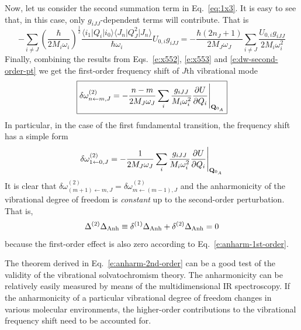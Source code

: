 \documentclass[a4paper,titlepage,twoside,fleqn,12pt]{book}
\begin{document}
\begin{refsection}
Now, let us consider the second summation term in Eq.~\eqref{eq:1x3}.
It is easy to see that, in this case, only $g_{iJJ}$\hyp{}dependent terms will
contribute. That is
%
\begin{equation}  \label{e:x553}
-\sum_{i\ne J} \left( \frac{\hbar}{2M_i\omega_i} \right)^\frac{1}{2}  %
\frac{\langle i_1 \vert Q_i \vert i_0 \rangle 
      \langle J_n \vert Q_J^2 \vert J_n \rangle } {\hbar\omega_i}
U_{0,i} g_{iJJ} = 
-\frac{\hbar\left(2n_J+1\right)}{2M_J\omega_J} \sum_{i\ne J} \frac{U_{0,i} g_{iJJ}}{2M_i\omega_i^2}
\end{equation} 
%
Finally, combining the results from Eqs.~\eqref{e:x552}, \eqref{e:x553} and \eqref{e:dw-second-order-pt}
we get the first\hyp{}order frequency shift of $J$th vibrational mode
%
\begin{equation}   \label{e:buckingham-2st-order}
\boxed{
\delta \omega_{n\leftarrow m,J}^{(2)} = 
-\frac{n-m}{2M_J\omega_J} \sum_{i} \frac{g_{iJJ}}{M_i\omega_i^2} 
\frac{\partial U}{\partial Q_i} \Bigg|_{{\bf Q}_{0_A}}
}
\end{equation}
%
In particular, in the case of the first fundamental transition, the frequency shift 
has a simple form
%
\begin{equation}
\delta \omega_{1\leftarrow 0,J}^{(2)} = 
-\frac{1}{2M_J\omega_J} \sum_{i} \frac{g_{iJJ}}{M_i\omega_i^2} 
\frac{\partial U}{\partial Q_i} \Bigg|_{{\bf Q}_{0_A}}
\end{equation}
%
It is clear that $\delta \omega_{(m+1)\leftarrow m,J}^{(2)} = \delta \omega_{m\leftarrow (m-1),J}^{(2)}$
and the anharmonicity of the vibrational degree of freedom is \emph{constant}
up to the second\hyp{}order perturbation. That is,
%
\begin{equation}  \label{e:anharm-2nd-order}
\Delta^{(2)} \Delta_{\rm Anh} \equiv \delta^{(1)} \Delta_{\rm Anh} + \delta^{(2)} \Delta_{\rm Anh} =  0
\end{equation}
%
because the first\hyp{}order effect is also zero according to Eq.~\eqref{e:anharm-1st-order}. 

The theorem derived in Eq.~\eqref{e:anharm-2nd-order} can be a good test of the validity
of the vibrational solvatochromism theory. The anharmonicity can be relatively easily measured
by means of the multidimensional IR spectroscopy. If the anharmonicity of a particular vibrational 
degree of freedom changes in various molecular environments, the higher\hyp{}order contributions 
to the vibrational frequency shift need to be accounted for. 


\end{refsection}
\end{document}
